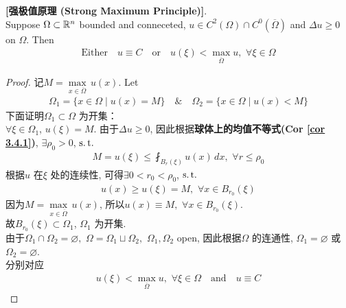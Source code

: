 	\begin{thm}\label{thm 3.4.4}
		\textbf{[强极值原理 (Strong Maximum Principle)]}. \\
		Suppose $\Omega \subset \mathbb{R}^n$ bounded and conneceted, $u \in C^2(\Omega) \cap C^0 \left( \overline{\Omega} \right)$ and $\Delta u \geq 0$ on $\Omega$. Then
		\begin{align*}
			\text{Either} \hspace{1em} u \equiv C \hspace{1em} \text{or} \hspace{1em} u(\xi) < \max_{\overline{\Omega}} u , \,\, \forall \xi \in \Omega
		\end{align*}
		
		\vspace{4em}
		
		\begin{proof}
			记$M = \underset{x \in \overline{\Omega}}{\max} \, u(x)$. Let 
			\begin{align*}
				\Omega_1 = \Big\{ x \in \Omega \mid u(x) = M \Big\} 
				\hspace{1em} \& \hspace{1em} 
				\Omega_2 = \Big\{ x \in \Omega \mid u(x) < M \Big\}
			\end{align*}
			下面证明$\Omega_1 \subset \Omega$ 为开集：\\
			$\forall \xi \in \Omega_1$, $u(\xi) = M$. 由于$\Delta u \geq 0$, 因此根据\textbf{球体上的均值不等式(Cor \ref{cor 3.4.1})}, $\exists \rho_0 > 0$, $\operatorname{s.t.}$
			\begin{align*}
				M = u(\xi) \leq \fint_{B_{r}(\xi)} u(x) \, dx , \,\, \forall r \leq \rho_0
			\end{align*}
			根据$u$ 在$\xi$ 处的连续性, 可得$\exists 0 < r_0 < \rho_0$, $\operatorname{s.t.}$ 
			\begin{align*}
				u(x) \geq u(\xi) = M , \,\, \forall x \in B_{r_0}(\xi)
			\end{align*}
			因为$M = \underset{x \in \overline{\Omega}}{\max} \, u(x)$, 所以$u(x) \equiv M , \,\, \forall x \in B_{r_0}(\xi)$. \\
			故$B_{r_0}(\xi) \subset \Omega_1$, $\Omega_1$ 为开集. \\
			由于$\Omega_1 \cap \Omega_2 = \varnothing , \,\, \Omega = \Omega_1 \sqcup \Omega_2 , \,\, \Omega_1 , \Omega_2$ open, 因此根据$\Omega$ 的连通性, $\Omega_1 = \varnothing$ 或$\Omega_2 = \varnothing$. \\
			分别对应 
			\begin{align*}
				 u(\xi) < \max_{\overline{\Omega}} u , \,\, \forall \xi \in \Omega \hspace{1em} \text{and} \hspace{1em} u \equiv C
			\end{align*}
		\end{proof}
	\end{thm}

